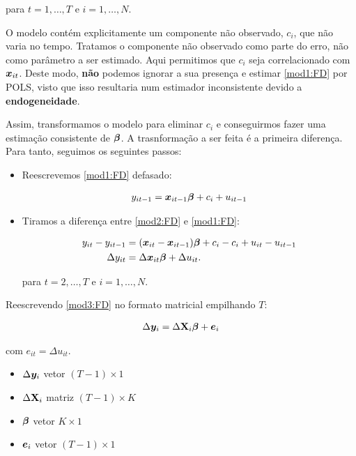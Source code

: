 \documentclass[11pt, oneside, a4paper, article]{article}
\numberwithin{equation}{section}
\begin{document}
\noindent
para
$t = 1, \dots, T$ e $i = 1, \dots, N$.

O modelo contém explicitamente um componente não observado, $c_{i}$, que não varia no tempo.
Tratamos o componente não observado como parte do erro, não como parâmetro a ser estimado.
Aqui permitimos que $c_{i}$ seja correlacionado com $\boldsymbol{x}_{it}$.
Deste modo, \textbf{não} podemos ignorar a sua presença e estimar \eqref{mod1:FD} por POLS, visto que isso resultaria num estimador inconsistente devido a \textbf{endogeneidade}.

Assim, transformamos o modelo para eliminar $c_{i}$ e conseguirmos fazer uma estimação consistente de $\boldsymbol{\beta}$.
A trasnformação a ser feita é a primeira diferença.
Para tanto, seguimos os seguintes passos:

\begin{itemize}\itemsep0pt
	\item Reescrevemos \eqref{mod1:FD} defasado:

		\vspace{-1 em}
		\begin{align}  \label{mod2:FD}
			y_{it-1} = \boldsymbol{x}_{it-1} \boldsymbol{\beta} + c_{i} + u_{it-1}
		\end{align}

	\item Tiramos a diferença entre \eqref{mod2:FD} e \eqref{mod1:FD}:

		\vspace{-1 em}
		\begin{align}
			\nonumber
			y_{it} - y_{it-1} &=
			(\boldsymbol{x}_{it} - \boldsymbol{x}_{it-1}) \boldsymbol{\beta} +
			c_{i} - c_{i} +
			u_{it} - u_{it-1}
			\\
			\label{mod3:FD}
			\Delta y_{it} &=
			\Delta \boldsymbol{x}_{it} \boldsymbol{\beta} +
			\Delta u_{it}. 
		\end{align}

		\noindent
		para
		$t = 2, \dots, T$ e $i = 1, \dots, N$.
\end{itemize}

Reescrevendo \eqref{mod3:FD} no formato matricial empilhando $T$:

\vspace{-1 em}
\begin{align} \label{mod4:FD}
	\Delta \boldsymbol{y}_{i} = \Delta \mathbf{X}_{i} \boldsymbol{\beta} + \boldsymbol{e}_{i}
\end{align}

\noindent
com 
$\boxed{e_{it} = \Delta u_{it}}$.

\begin{itemize}\itemsep0pt
	\item
		$\Delta \boldsymbol{y}_{i}$ vetor $( T - 1 ) \times 1$ 
	\item
		$\Delta \mathbf{X}_{i}$  matriz  $( T - 1 ) \times K$
	\item
		$\boldsymbol{\beta}$ vetor $K \times 1$
	\item
		$\boldsymbol{e}_{i}$ vetor $(T - 1 ) \times 1$
\end{itemize}
\end{document}
